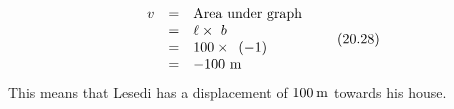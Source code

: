     \begin{equation}
    \begin{array}{ccc}\hfill v& =& \mathrm{Area}\phantom{\rule{3.33333pt}{0ex}}\mathrm{under}\phantom{\rule{3.33333pt}{0ex}}\mathrm{graph}\hfill \\ & =& \ell \ensuremath{\times}\phantom{\rule{3.33333pt}{0ex}}b\hfill \\ & =& 100\ensuremath{\times}\phantom{\rule{3.33333pt}{0ex}}\left(-1\right)\hfill \\ & =& -100\phantom{\rule{3.33333pt}{0ex}}\mathrm{m}\hfill \end{array}\tag{20.28}
      \end{equation}
        \label{m38795*id71010}This means that Lesedi has a displacement of $100\phantom{\rule{2pt}{0ex}}\mathrm{m}$ towards his house.\par 
\label{m38795*secfhsst!!!underscore!!!id2587}
